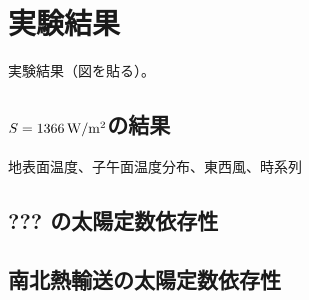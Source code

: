 \documentclass[body]{subfiles}
\begin{document}
\chapter{実験結果}

実験結果（図を貼る）。

\section{\(S=1366\hmu{W/m^2}\)の結果}
地表面温度、子午面温度分布、東西風、時系列

\section{??? の太陽定数依存性}

\section{南北熱輸送の太陽定数依存性}
\end{document}
